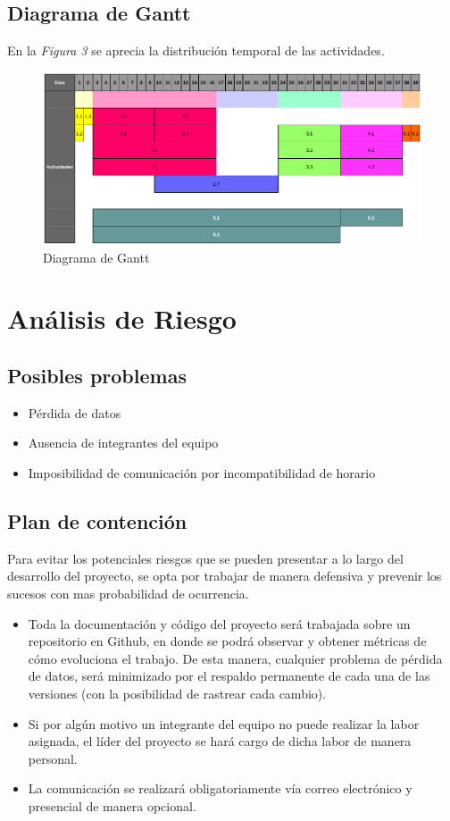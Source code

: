 \documentclass[letterpaper]{article}
\begin{document}
\subsection{Diagrama de Gantt}
En la \emph{Figura 3} se aprecia la distribución temporal de las actividades.
\begin{figure}[h!]
  \centering
  \includegraphics[width=1\textwidth]{Gantt.png}
  \caption{Diagrama de Gantt}
\end{figure}

\section{Análisis de Riesgo}

\subsection{Posibles problemas}
\begin{itemize}
\item Pérdida de datos
\item Ausencia de integrantes del equipo
\item Imposibilidad de comunicación por incompatibilidad de horario
\end{itemize}

\subsection{Plan de contención}
Para evitar los potenciales riesgos que se pueden presentar a lo largo del desarrollo del proyecto, se opta por trabajar de manera defensiva y prevenir los sucesos con mas probabilidad de ocurrencia.

\begin{itemize}
\item Toda la documentación y código del proyecto será trabajada sobre un repositorio en Github, en donde se podrá observar y obtener métricas de cómo evoluciona el trabajo. De esta manera, cualquier problema de pérdida de datos, será minimizado por el respaldo permanente de cada una de las versiones (con la posibilidad de rastrear cada cambio).
\item Si por algún motivo un integrante del equipo no puede realizar la labor asignada, el líder del proyecto se hará cargo de dicha labor de manera personal.
\item La comunicación se realizará obligatoriamente vía correo electrónico y presencial de manera opcional.
\end{itemize}
\end{document}
